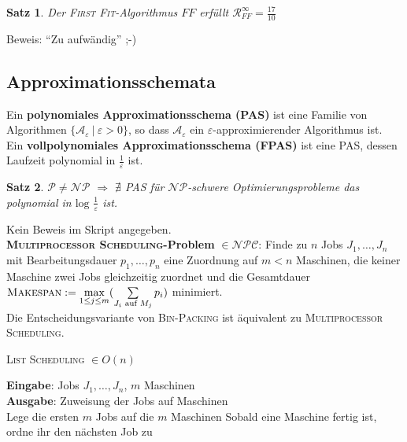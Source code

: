 \documentclass[a4paper,10pt]{scrartcl}
\newcommand{\tbf}{\textbf}
\newcommand{\tsc}{\textsc}
\newcommand{\Ra}{\Rightarrow}
\newcommand{\NP}{\mathcal{NP}}
\newcommand{\NPC}{\mathcal{NPC}}
\newcommand{\calA}{\mathcal{A}}
\newcommand{\calP}{\mathcal{P}}
\newcommand{\calR}{\mathcal{R}}
\newcommand{\Eingabe}[1]{\STATE \tbf{Eingabe}: #1 \\}
\newcommand{\Ausgabe}[1]{\STATE \tbf{Ausgabe}: #1 \\}
\newtheorem{satz}{Satz}
\begin{document}
\begin{satz}
 Der \tsc{First Fit}-Algorithmus $FF$ erfüllt $\calR_{FF}^\infty = \frac{17}{10}$
\end{satz}

Beweis: ``Zu aufwändig'' ;-) \\

\subsection{Approximationsschemata}
Ein \tbf{polynomiales Approximationsschema (PAS)} ist eine Familie von Algorithmen $\{ \calA_\varepsilon \ | \ \varepsilon > 0 \}$, so dass $\calA_\varepsilon$ ein $\varepsilon$-approximierender Algorithmus ist. \\

Ein \tbf{vollpolynomiales Approximationsschema (FPAS)} ist eine PAS, dessen Laufzeit polynomial in $\frac{1}{\varepsilon}$ ist. \\

\begin{satz}
  $\calP \not = \NP$ $\Ra$ $\nexists$ PAS für $\NP$-schwere Optimierungsprobleme das polynomial in $\text{log } \frac{1}{\varepsilon}$ ist.
\end{satz}

Kein Beweis im Skript angegeben. \\

\tbf{\tsc{Multiprocessor Scheduling}-Problem} $\in \NPC$: Finde zu $n$ Jobs $J_1, \ldots, J_n$ mit Bearbeitungsdauer $p_1, \ldots, p_n$ eine Zuordnung auf $m < n$ Maschinen, die keiner Maschine zwei Jobs gleichzeitig zuordnet und die Gesamtdauer $\tsc{Makespan} := \underset{1 \leq j \leq m}{\text{max}}( \sum_{J_i \text{ auf } M_j} \limits p_i)$ minimiert. \\

Die Entscheidungsvariante von \tsc{Bin-Packing} ist äquivalent zu \tsc{Multiprocessor Scheduling}. \\

\begin{algorithm}
\caption{\tsc{List Scheduling} $\in O(n)$}
\begin{algorithmic}
\Eingabe{Jobs $J_1, \ldots, J_n$, $m$ Maschinen}
\Ausgabe{Zuweisung der Jobs auf Maschinen}
\STATE Lege die ersten $m$ Jobs auf die $m$ Maschinen
\STATE Sobald eine Maschine fertig ist, ordne ihr den nächsten Job zu
\end{algorithmic}
\end{algorithm}
\end{document}
